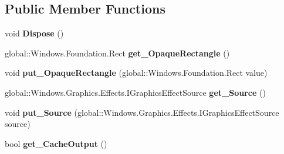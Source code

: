 \subsection*{Public Member Functions}
\begin{DoxyCompactItemize}
\item 
\mbox{\label{class_microsoft_1_1_graphics_1_1_canvas_1_1_effects_1_1_opacity_metadata_effect_a355e8bde1730568d5c65491433cfece2}} 
void {\bfseries Dispose} ()
\item 
\mbox{\label{class_microsoft_1_1_graphics_1_1_canvas_1_1_effects_1_1_opacity_metadata_effect_aa360b363d94c0286ff34a27fa222157d}} 
global\+::\+Windows.\+Foundation.\+Rect {\bfseries get\+\_\+\+Opaque\+Rectangle} ()
\item 
\mbox{\label{class_microsoft_1_1_graphics_1_1_canvas_1_1_effects_1_1_opacity_metadata_effect_a752b964fd8b321bf838b48bb89f8d7e1}} 
void {\bfseries put\+\_\+\+Opaque\+Rectangle} (global\+::\+Windows.\+Foundation.\+Rect value)
\item 
\mbox{\label{class_microsoft_1_1_graphics_1_1_canvas_1_1_effects_1_1_opacity_metadata_effect_a9e94b0b3c7782db191d1c822e23cc7a5}} 
global\+::\+Windows.\+Graphics.\+Effects.\+I\+Graphics\+Effect\+Source {\bfseries get\+\_\+\+Source} ()
\item 
\mbox{\label{class_microsoft_1_1_graphics_1_1_canvas_1_1_effects_1_1_opacity_metadata_effect_aa1b1cb9fe52fe042f40cab148d0b4930}} 
void {\bfseries put\+\_\+\+Source} (global\+::\+Windows.\+Graphics.\+Effects.\+I\+Graphics\+Effect\+Source source)
\item 
\mbox{\label{class_microsoft_1_1_graphics_1_1_canvas_1_1_effects_1_1_opacity_metadata_effect_a28afbc43c6ace58eb28ebca54757e0a6}} 
bool {\bfseries get\+\_\+\+Cache\+Output} ()
\item 

\end{DoxyCompactItemize}

